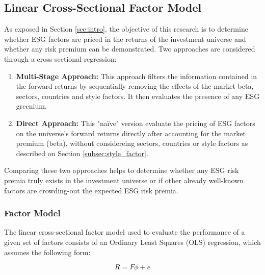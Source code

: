 \documentclass[11pt,a4paper]{article}
\begin{document}
\subsection{Linear Cross-Sectional Factor Model}\label{subsec:fact_models}

As exposed in Section \ref{sec:intro}, the objective of this research is to determine whether ESG factors are priced in the returns of the investment universe and whether any risk premium can be demonstrated. Two approaches are considered through a cross-sectional regression:

\begin{enumerate}
    \item \textbf{Multi-Stage Approach:} This approach filters the information contained in the forward returns by sequentially removing the effects of the market beta, sectors, countries and style factors. It then evaluates the presence of any ESG greenium. 
    \item \textbf{Direct Approach:} This "naïve" version evaluate the pricing of ESG factors on the universe's forward returns directly after accounting for the market premium (beta), without considereing sectors, countries or style factors as described on Section \ref{subsec:style_factor}.
\end{enumerate}

Comparing these two approaches helps to determine whether any ESG risk premia truly exists in the investment universe or if other already well-known factors are crowding-out the expected ESG risk premia. 

\subsubsection{Factor Model}\label{subsec:fact_model}

The linear cross-sectional factor model used to evaluate the performance of a given set of factors consists of an Ordinary Least Squares (OLS) regression, which assumes the following form:

\begin{equation}
    R = F \phi + e
\end{equation}
\end{document}

